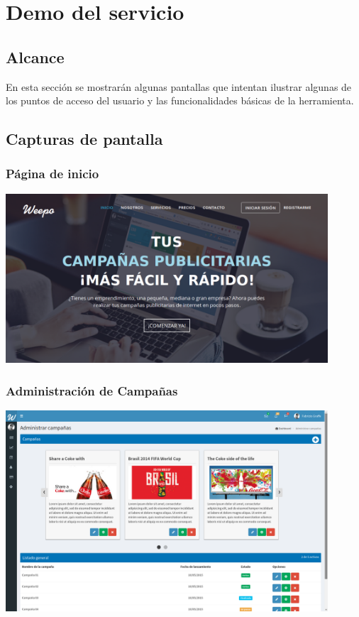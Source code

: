 \documentclass[oneside]{book}
\begin{document}
\newpage




%
%
\chapter{Demo del servicio}


\section{Alcance}

En esta secci\'{o}n se mostrar\'{a}n algunas pantallas que intentan ilustrar algunas de los puntos de acceso del usuario y las funcionalidades b\'{a}sicas de la herramienta.
\bigskip


\section{Capturas de pantalla}

\subsection{P\'{a}gina de inicio}

\includegraphics[width=0.9\textwidth]{images/index.png}
\medskip

\subsection{Administraci\'{o}n de Campañas}

\includegraphics[width=0.9\textwidth]{images/adminCampanias.png}
\end{document}
